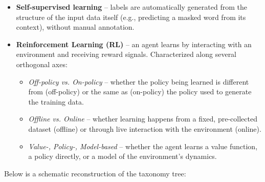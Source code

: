 \begin{itemize}
    \vspace{0.2cm}
    \item \textbf{Self-supervised learning} -- labels are automatically generated from the structure of the input data itself (e.g., predicting a masked word from its context), without manual annotation.
    \vspace{0.2cm}
    \item \textbf{Reinforcement Learning (RL)} -- an agent learns by interacting with an environment and receiving reward signals. Characterized along several orthogonal axes:
    \begin{itemize}
        \item \emph{Off-policy vs. On-policy} -- whether the policy being learned is different from (off-policy) or the same as (on-policy) the policy used to generate the training data.
        \item \emph{Offline vs. Online} -- whether learning happens from a fixed, pre-collected dataset (offline) or through live interaction with the environment (online).
        \item \emph{Value-, Policy-, Model-based} -- whether the agent learns a value function, a policy directly, or a model of the environment's dynamics.
    \end{itemize}
\end{itemize}

Below is a schematic reconstruction of the taxonomy tree:

